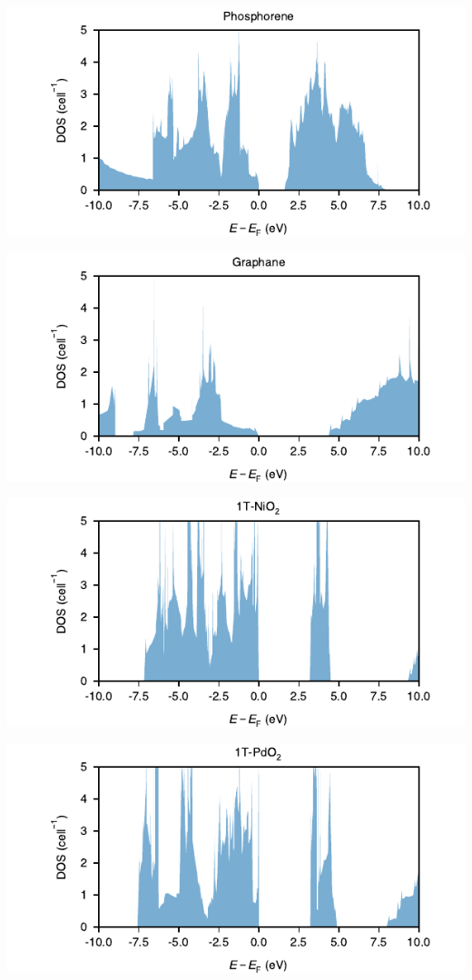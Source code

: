 \begin{center}
\includegraphics[width=.9\linewidth]{img/SI_figs/Phosphorene-DOS.pdf}
\end{center}
\begin{center}
\includegraphics[width=.9\linewidth]{img/SI_figs/Graphane-DOS.pdf}
\end{center}
\begin{center}
\includegraphics[width=.9\linewidth]{img/SI_figs/1T-NiO2-DOS.pdf}
\end{center}
\begin{center}
\includegraphics[width=.9\linewidth]{img/SI_figs/1T-PdO2-DOS.pdf}
\end{center}
